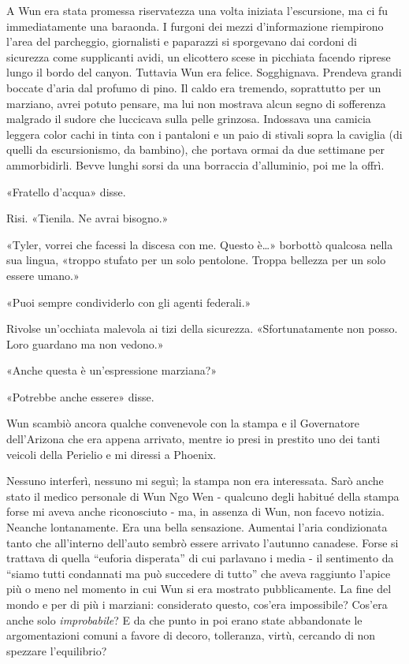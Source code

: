 A Wun era stata promessa riservatezza una volta iniziata l'escursione,
ma ci fu immediatamente una baraonda. I furgoni dei mezzi d'informazione
riempirono l'area del parcheggio, giornalisti e paparazzi si sporgevano
dai cordoni di sicurezza come supplicanti avidi, un elicottero scese in
picchiata facendo riprese lungo il bordo del canyon. Tuttavia Wun era
felice. Sogghignava. Prendeva grandi boccate d'aria dal profumo di pino.
Il caldo era tremendo, soprattutto per un marziano, avrei potuto
pensare, ma lui non mostrava alcun segno di sofferenza malgrado il
sudore che luccicava sulla pelle grinzosa. Indossava una camicia leggera
color cachi in tinta con i pantaloni e un paio di stivali sopra la
caviglia (di quelli da escursionismo, da bambino), che portava ormai da
due settimane per ammorbidirli. Bevve lunghi sorsi da una borraccia
d'alluminio, poi me la offrì.

«Fratello d'acqua» disse.

Risi. «Tienila. Ne avrai bisogno.»

«Tyler, vorrei che facessi la discesa con me. Questo è\ldots» borbottò
qualcosa nella sua lingua, «troppo stufato per un solo pentolone. Troppa
bellezza per un solo essere umano.»

«Puoi sempre condividerlo con gli agenti federali.»

Rivolse un'occhiata malevola ai tizi della sicurezza. «Sfortunatamente
non posso. Loro guardano ma non vedono.»

«Anche questa è un'espressione marziana?»

«Potrebbe anche essere» disse.

\separatorefiori

Wun scambiò ancora qualche convenevole con la stampa e il Governatore
dell'Arizona che era appena arrivato, mentre io presi in prestito uno
dei tanti veicoli della Perielio e mi diressi a Phoenix.

Nessuno interferì, nessuno mi seguì; la stampa non era interessata. Sarò
anche stato il medico personale di Wun Ngo Wen - qualcuno degli habitué
della stampa forse mi aveva anche riconosciuto - ma, in assenza di Wun,
non facevo notizia. Neanche lontanamente. Era una bella sensazione.
Aumentai l'aria condizionata tanto che all'interno dell'auto sembrò
essere arrivato l'autunno canadese. Forse si trattava di quella
``euforia disperata'' di cui parlavano i media - il sentimento da
``siamo tutti condannati ma può succedere di tutto'' che aveva raggiunto
l'apice più o meno nel momento in cui Wun si era mostrato pubblicamente.
La fine del mondo e per di più i marziani: considerato questo, cos'era
impossibile? Cos'era anche solo \emph{improbabile}? E da che punto in
poi erano state abbandonate le argomentazioni comuni a favore di decoro,
tolleranza, virtù, cercando di non spezzare l'equilibrio?


